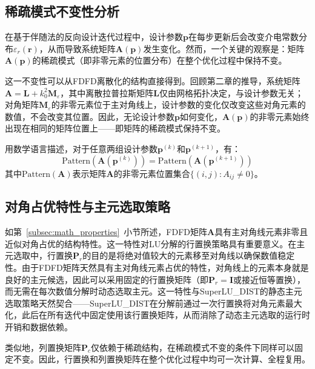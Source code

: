 \subsection{稀疏模式不变性分析}

在基于伴随法的反向设计迭代过程中，设计参数$\boldsymbol{p}$在每步更新后会改变介电常数分布$\varepsilon_r(\boldsymbol{r})$，从而导致系统矩阵$\boldsymbol{A}(\boldsymbol{p})$发生变化。然而，一个关键的观察是：矩阵$\boldsymbol{A}(\boldsymbol{p})$的稀疏模式（即非零元素的位置分布）在整个优化过程中保持不变\cite{Shin2012}。

这一不变性可以从FDFD离散化的结构直接得到。回顾第二章的推导，系统矩阵$\boldsymbol{A} = \boldsymbol{L} + k_0^2 \boldsymbol{M}_\varepsilon$，其中离散拉普拉斯矩阵$\boldsymbol{L}$仅由网格拓扑决定，与设计参数无关；对角矩阵$\boldsymbol{M}_\varepsilon$的非零元素位于主对角线上，设计参数的变化仅改变这些对角元素的数值，不会改变其位置。因此，无论设计参数$\boldsymbol{p}$如何变化，$\boldsymbol{A}(\boldsymbol{p})$的非零元素始终出现在相同的矩阵位置上——即矩阵的稀疏模式保持不变。

用数学语言描述，对于任意两组设计参数$\boldsymbol{p}^{(k)}$和$\boldsymbol{p}^{(k+1)}$，有：
\begin{equation}
  \mathrm{Pattern}(\boldsymbol{A}(\boldsymbol{p}^{(k)})) = \mathrm{Pattern}(\boldsymbol{A}(\boldsymbol{p}^{(k+1)}))
  \label{eq:pattern_invariance}
\end{equation}
其中$\mathrm{Pattern}(\boldsymbol{A})$表示矩阵$\boldsymbol{A}$的非零元素位置集合$\{(i,j) : A_{ij} \neq 0\}$。

\subsection{对角占优特性与主元选取策略}

如第~\ref{subsec:math_properties}~小节所述，FDFD矩阵$\boldsymbol{A}$具有主对角线元素非零且近似对角占优的结构特性。这一特性对LU分解的行置换策略具有重要意义。在主元选取中，行置换$\boldsymbol{P}_r$的目的是将绝对值较大的元素移至对角线以确保数值稳定性。由于FDFD矩阵天然具有主对角线元素占优的特性，对角线上的元素本身就是良好的主元候选，因此可以采用固定的行置换矩阵（即$\boldsymbol{P}_r = \boldsymbol{I}$或接近恒等置换），而无需在每次数值分解时动态选取主元。这一特性与SuperLU\_DIST的静态主元选取策略天然契合——SuperLU\_DIST在分解前通过一次行置换将对角元素最大化，此后在所有迭代中固定使用该行置换矩阵，从而消除了动态主元选取的运行时开销和数据依赖。

类似地，列置换矩阵$\boldsymbol{P}_c$仅依赖于稀疏结构，在稀疏模式不变的条件下同样可以固定不变。因此，行置换和列置换矩阵在整个优化过程中均可一次计算、全程复用。

